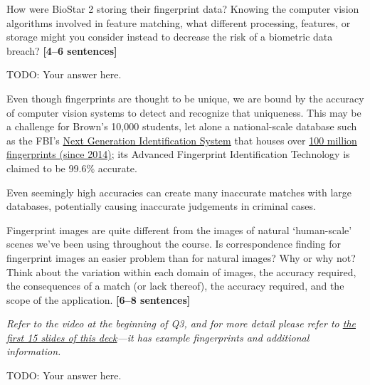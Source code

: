 \documentclass{csci1430}
\begin{document}
\begin{subquestion}[points=3]
How were BioStar 2 storing their fingerprint data? Knowing the computer vision algorithms involved in feature matching, what different processing, features, or storage might you consider instead to decrease the risk of a biometric data breach? \textbf{[4--6 sentences]}
\end{subquestion}

\begin{answer}[height=16]
TODO: Your answer here.
\end{answer}

\pagebreak

\begin{subquestion}[points=4,drawbox=false]
Even though fingerprints are thought to be unique, we are bound by the accuracy of computer vision systems to detect and recognize that uniqueness.
This may be a challenge for Brown's 10,000 students, let alone a national-scale database such as the FBI's \href{https://www.fbi.gov/services/cjis/fingerprints-and-other-biometrics/ngi}{Next Generation Identification System} that houses over \href{https://en.wikipedia.org/wiki/Next_Generation_Identification}{100 million fingerprints (since 2014)}; its Advanced Fingerprint Identification Technology is claimed to be 99.6\% accurate.

Even seemingly high accuracies can create many inaccurate matches with large databases, potentially causing inaccurate judgements in criminal cases.
\end{subquestion}

\begin{orangebox}
Fingerprint images are quite different from the images of natural `human-scale' scenes we've been using throughout the course. Is correspondence finding for fingerprint images an easier problem than for natural images? Why or why not? Think about the variation within each domain of images, the accuracy required, the consequences of a match (or lack thereof), the accuracy required, and the scope of the application. \textbf{[6--8 sentences]}

\emph{Refer to the video at the beginning of Q3, and for more detail please refer to \href{http://biometrics.cse.msu.edu/Presentations/AnilJain_UniquenessOfFingerprints_NAS05.pdf}{the first 15 slides of this deck}---it has example fingerprints and additional information.}
\end{orangebox}

\begin{answer}[height=16]
TODO: Your answer here.
\end{answer}
\end{document}
